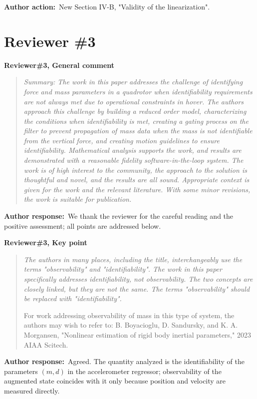\documentclass[11pt]{article}
\newcommand{\concern}[1]{\par\medskip\noindent\colorbox{gray!12}{\parbox{\dimexpr\linewidth-2\fboxsep}{\textbf{#1}}}\par\smallskip}
\newcommand{\rlabel}[1]{\par\textbf{#1}\ }
\begin{document}
\rlabel{Author action:}New Section IV-B, "Validity of the linearization".

\section*{Reviewer \#3}

\concern{Reviewer\#3, General comment}

\begin{quote}\itshape Summary: The work in this paper addresses the challenge of identifying force and mass parameters in a quadrotor when identifiability requirements are not always met due to operational constraints in hover. The authors approach this challenge by building a reduced order model, characterizing the conditions when identifiability is met, creating a gating process on the filter to prevent propagation of mass data when the mass is not identifiable from the vertical force, and creating motion guidelines to ensure identifiability. Mathematical analysis supports the work, and results are demonstrated with a reasonable fidelity software-in-the-loop system. The work is of high interest to the community, the approach to the solution is thoughtful and novel, and the results are all sound. Appropriate context is given for the work and the relevant literature. With some minor revisions, the work is suitable for publication.\end{quote}

\rlabel{Author response:}We thank the reviewer for the careful reading and the positive assessment; all points are addressed below.

\concern{Reviewer\#3, Key point}

\begin{quote}\itshape The authors in many places, including the title, interchangeably use the terms "observability" and "identifiability". The work in this paper specifically addresses identifiability, not observability. The two concepts are closely linked, but they are not the same. The terms "observability" should be replaced with "identifiability".\par For work addressing observability of mass in this type of system, the authors may wish to refer to: B. Boyacioglu, D. Sandursky, and K. A. Morgansen, "Nonlinear estimation of rigid body inertial parameters," 2023 AIAA Scitech.\end{quote}

\rlabel{Author response:}Agreed. The quantity analyzed is the identifiability of the parameters $(m, d)$ in the accelerometer regressor; observability of the augmented state coincides with it only because position and velocity are measured directly.
\end{document}
